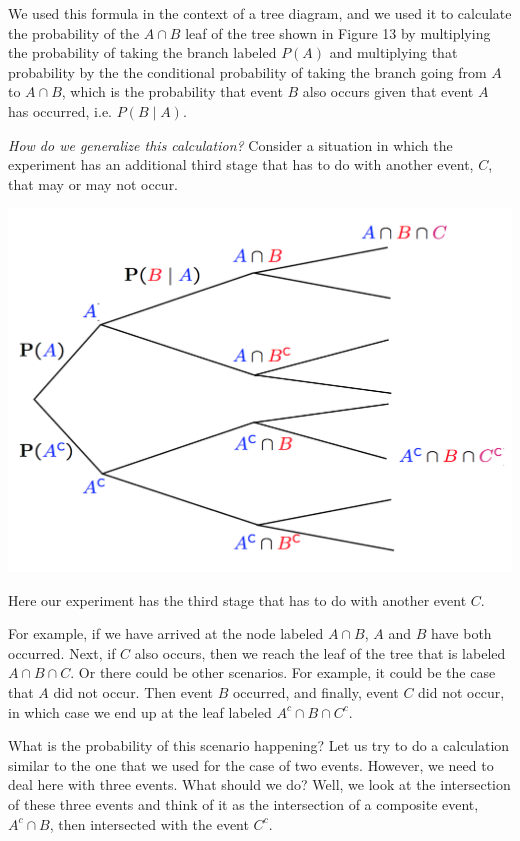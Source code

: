 \documentclass{tufte-handout}
\begin{document}
We used this formula in the context of a tree diagram, and we used it to calculate the probability of the
$A \cap B$ leaf of 
the tree shown in Figure 13 by multiplying the probability of taking the
branch labeled $P(A)$ and multiplying that probability by the the conditional probability of taking the branch
going from $A$ to $A\cap B$, which is the
probability that event $B$ also occurs given that event $A$ has occurred, i.e. $P(B \mid A)$.

\vspace{0.2cm}
\textit{How do we generalize this calculation?} Consider a situation in which the experiment has an additional
third stage that has to do with another event, $C$, that may or may not occur.

\pagebreak
\begin{marginfigure}
  \includegraphics{GeneralizedTree}
  \caption{Here our experiment has the third stage that has to do with another event $C$.}
\end{marginfigure}


For example, if we have arrived at the node labeled $A \cap B$, $A$ and $B$ have both occurred. Next, if $C$ also occurs, then we
reach the leaf of the tree that is labeled $A \cap B \cap C$. Or there could be other scenarios. For example, it could be the
case that $A$ did not occur. Then event $B$ occurred, and finally, event $C$ did not occur, in which case we
end up at the leaf labeled $A^c \cap B \cap C^c$.

What is the probability of this scenario happening? Let us try to do a calculation similar to the one that
we used for the case of two events. However, we need to deal here with three events. What should we
do? Well, we look at the intersection of these three events and think of it as the intersection of a
composite event, $A^c \cap B$, then intersected with the event $C^c$. 
\end{document}
